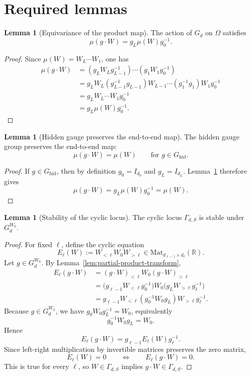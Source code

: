 \documentclass{article}
\newcommand{\R}{\mathbb{R}}
\newcommand{\Mat}{\mathrm{Mat}}
\theoremstyle{definition}
\newtheorem{lemma}[theorem]{Lemma}
\begin{document}
\section{Required lemmas}

\begin{lemma}[Equivariance of the product map]\label{lem:mu-equivariant}
The action of $G_d$ on $\Omega$ satisfies
\[
\mu(g\cdot W)=g_L\mu(W)g_0^{-1}.
\]
\end{lemma}

\begin{proof}
Since $\mu(W)=W_L\cdots W_1$, one has
\begin{align*}
\mu(g\cdot W)
&=
(g_LW_Lg_{L-1}^{-1})\cdots(g_1W_1g_0^{-1}) \\
&=
g_LW_L(g_{L-1}^{-1}g_{L-1})W_{L-1}\cdots(g_1^{-1}g_1)W_1g_0^{-1} \\
&=
g_LW_L\cdots W_1g_0^{-1} \\
&=
g_L\mu(W)g_0^{-1}.
\end{align*}
\end{proof}

\begin{lemma}[Hidden gauge preserves the end-to-end map]\label{lem:hidden-gauge-preserves-mu}
The hidden gauge group preserves the end-to-end map:
\[
\mu(g\cdot W)=\mu(W)
\qquad
\text{for } g\in G_{\mathrm{hid}}.
\]
\end{lemma}

\begin{proof}
If $g\in G_{\mathrm{hid}}$, then by definition $g_0=I_{d_0}$ and $g_L=I_{d_L}$. Lemma~\ref{lem:mu-equivariant} therefore gives
\[
\mu(g\cdot W)=g_L\mu(W)g_0^{-1}=\mu(W).
\]
\end{proof}

\begin{lemma}[Stability of the cyclic locus]\label{lem:gamma-stable}
The cyclic locus $\Gamma_{d,S}$ is stable under $G_d^{W_0}$.
\end{lemma}

\begin{proof}
For fixed $\ell$, define the cyclic equation
\[
E_\ell(W):=W_{<\ell}W_0W_{>\ell}\in \Mat_{d_{\ell-1}\times d_\ell}(\R).
\]
Let $g\in G_d^{W_0}$. By Lemma~\ref{lem:partial-product-transform},
\begin{align*}
E_\ell(g\cdot W)
&=
(g\cdot W)_{<\ell}W_0(g\cdot W)_{>\ell} \\
&=
\bigl(g_{\ell-1}W_{<\ell}g_0^{-1}\bigr)W_0\bigl(g_LW_{>\ell}g_\ell^{-1}\bigr) \\
&=
g_{\ell-1}W_{<\ell}(g_0^{-1}W_0g_L)W_{>\ell}g_\ell^{-1}.
\end{align*}
Because $g\in G_d^{W_0}$, we have $g_0W_0g_L^{-1}=W_0$, equivalently
\[
g_0^{-1}W_0g_L=W_0.
\]
Hence
\[
E_\ell(g\cdot W)=g_{\ell-1}E_\ell(W)g_\ell^{-1}.
\]
Since left-right multiplication by invertible matrices preserves the zero matrix,
\[
E_\ell(W)=0
\qquad\Longleftrightarrow\qquad
E_\ell(g\cdot W)=0.
\]
This is true for every $\ell$, so $W\in \Gamma_{d,S}$ implies $g\cdot W\in \Gamma_{d,S}$.
\end{proof}
\end{document}
